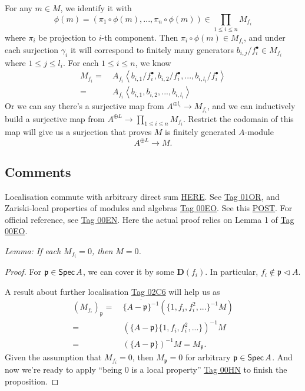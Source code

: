 For any $m\in M$, we identify it with \[\phi(m)=(\pi_1\circ \phi(m),...,\pi_n\circ\phi(m))\in\prod_{1\leq i\leq n}M_{f_i}\] where $\pi_i$ be projection to $i$-th component. Then $\pi_i\circ \phi(m)\in M_{f_i}$, and under each surjection $\gamma_i$ it will correspond to finitely many generators $b_{i,j}/f^{\bullet}_{i}\in M_{f_i}$ where $1\leq j\leq l_i$. For each $1\leq i\leq n$, we know 
\begin{align*}
	M_{f_i}=&~ A_{f_i} \left\langle b_{i,1}/f^{\bullet}_{i}, b_{i,2}/f^{\bullet}_{i}, ..., b_{i,l_i}/f^{\bullet}_{i}\right\rangle\\
	=&~ A_{f_i} \left\langle b_{i,1}, b_{i,2}, ..., b_{i,l_i}\right\rangle
\end{align*}
Or we can say there's a surjective map from $A^{\oplus l_i}\to M_{f_i}$, and we can inductively build a surjective map from $A^{\oplus L}\to \prod_{1\leq i\leq n}M_{f_i}$. Restrict the codomain of this map will give us a surjection that proves $M$ is finitely generated $A$-module
\[A^{\oplus L}\to M.\]


\subsection{Comments}

Localisation commute with arbitrary direct sum \href{https://math.stackexchange.com/questions/3386775/localization-commutes-with-arbitrary-direct-sums}{HERE}. 
See \href{https://stacks.math.columbia.edu/tag/01OR}{Tag 01OR}, and Zariski-local properties of modules and algebras \href{https://stacks.math.columbia.edu/tag/00EO}{Tag 00EO}.
See this \href{https://mathoverflow.net/questions/52014/is-being-finitely-generated-a-local-property}{POST}.
For official reference, see \href{https://stacks.math.columbia.edu/tag/00EN}{Tag 00EN}. Here the actual proof relies on Lemma 1 of \href{https://stacks.math.columbia.edu/tag/00EO}{Tag 00EO}.


\textit{Lemma: If each $M_{f_i}=0$, then $M=0$.}
\begin{proof}
	For $\mathfrak p\in \operatorname{\mathsf{Spec}} A$, we can cover it by some $\mathbf D(f_i)$. In particular, $f_i\notin \mathfrak p\triangleleft A$.

	A result about further localisation \href{https://stacks.math.columbia.edu/tag/02C6}{Tag 02C6} will help us as
	\begin{align*}
		(M_{f_i})_{\mathfrak p} =&~ \overline{\{A-\mathfrak p\}^{-1}}(\{1,f_i,f_i^2,...\}^{-1}M)\\
		=&~ (\{A-\mathfrak p\}\{1,f_i,f_i^2,...\})^{-1}M\\
		=&~ (\{A-\mathfrak p\})^{-1}M=M_{\mathfrak p}.
	\end{align*}
	Given the assumption that $M_{f_i}=0$, then $M_{\mathfrak p}=0$ for arbitrary $\mathfrak p\in\operatorname{\mathsf{Spec}} A$. And now we're ready to apply \enquote{being 0 is a local property} \href{https://stacks.math.columbia.edu/tag/00HN}{Tag 00HN} to finish the proposition. 

\end{proof}



